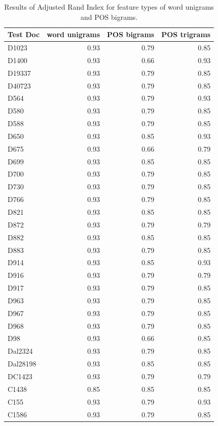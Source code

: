 \documentclass[a4paper,10pt,twoside,fleqn]{article}
\begin{document}
\begin{table}
\small 
\label{tab:results-clust}
\caption{Results of Adjusted Rand Index for feature types of word unigrams and POS bigrams.}
 \begin{tabular}{lrrr} \toprule
Test Doc       & word unigrams & POS bigrams & POS trigrams\\ \midrule
D1023     & 0.93  & 0.79  & 0.85 \\
D1400     & 0.93  & 0.66  & 0.93 \\
D19337    & 0.93  & 0.79  & 0.85 \\
D40723    & 0.93  & 0.79  & 0.85 \\
D564      & 0.93  & 0.79  & 0.93 \\
D580      & 0.93  & 0.79  & 0.85 \\
D588      & 0.93  & 0.79  & 0.85 \\
D650      & 0.93  & 0.85  & 0.93 \\
D675      & 0.93  & 0.66  & 0.79 \\
D699      & 0.93  & 0.85  & 0.85 \\
D700      & 0.93  & 0.79  & 0.85 \\
D730      & 0.93  & 0.79  & 0.85 \\
D766      & 0.93  & 0.79  & 0.85 \\
D821      & 0.93  & 0.85  & 0.85 \\
D872      & 0.93  & 0.79  & 0.79 \\
D882      & 0.93  & 0.85  & 0.85 \\
D883      & 0.93  & 0.79  & 0.85 \\
D914      & 0.93  & 0.85  & 0.93 \\
D916      & 0.93  & 0.79  & 0.79 \\
D917      & 0.93  & 0.79  & 0.85 \\
D963      & 0.93  & 0.79  & 0.85 \\
D967      & 0.93  & 0.79  & 0.85 \\
D968      & 0.93  & 0.79  & 0.85 \\
D98       & 0.93  & 0.66  & 0.85 \\
Dal2324   & 0.93  & 0.79  & 0.85 \\
Dal28198  & 0.93  & 0.85  & 0.85 \\
DC1423    & 0.93  & 0.79  & 0.79 \\
C1438     & 0.85  & 0.85  & 0.85 \\
C155      & 0.93  & 0.79  & 0.93 \\
C1586     & 0.93  & 0.79  & 0.85 \\

\end{tabular}
\end{table}
\end{document}

